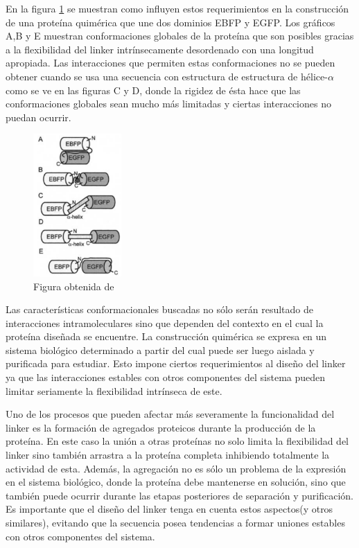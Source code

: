 En la figura \ref{conformacionLinker} se muestran como influyen estos requerimientos en la construcción de una proteína quimérica que une dos dominios EBFP y EGFP. 
Los gráficos A,B y E muestran conformaciones globales de la proteína que son posibles gracias a la flexibilidad del linker intrínsecamente desordenado con una longitud apropiada. 
Las interacciones que permiten estas conformaciones no se pueden obtener cuando se usa una secuencia con estructura de estructura de hélice-$\alpha$ como se ve en las figuras C y D, donde la rigidez de ésta
hace que las conformaciones globales sean mucho más limitadas y ciertas interacciones no puedan ocurrir.


\begin{figure}[htbp]
\centering
\includegraphics[width=0.3\textwidth]{img/conformacionLinker.png} 
\caption{Figura obtenida de \cite{arai2004conformations}}
\label{conformacionLinker}
\end{figure}



Las características conformacionales buscadas no sólo serán resultado de interacciones intramoleculares sino que dependen del contexto en el cual la proteína diseñada se encuentre. 
La construcción quimérica se expresa en un sistema biológico determinado a partir del cual puede ser luego aislada y purificada para estudiar. 
Esto impone ciertos requerimientos al diseño del linker ya que las interacciones estables con otros componentes del sistema pueden limitar seriamente la flexibilidad intrínseca de este.

Uno de los procesos que pueden afectar más severamente la funcionalidad del linker es la formación de agregados proteicos durante la producción de la proteína\cite{lebendiker2014production}.
En este caso la unión a otras proteínas no solo limita la flexibilidad del linker sino también arrastra a la proteína completa inhibiendo totalmente la actividad de esta.
Además, la agregación no es sólo un problema de la expresión en el sistema biológico, donde la proteína debe mantenerse en solución,
sino que también puede ocurrir durante las etapas posteriores de separación y purificación.
Es importante que el diseño del linker tenga en cuenta estos aspectos(y otros similares), evitando que la secuencia posea tendencias a formar uniones estables con otros componentes del sistema.


